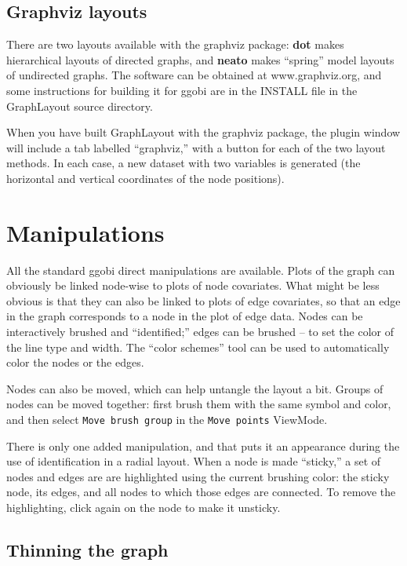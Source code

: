 \documentclass[11pt]{article}
\begin{document}
\subsection {Graphviz layouts}

There are two layouts available with the graphviz \cite{GansnerNorth00}
package:  {\bf dot} makes hierarchical layouts of directed graphs,
and {\bf neato} makes ``spring'' model layouts of undirected graphs.
The software can be obtained at www.graphviz.org, and some instructions
for building it for ggobi are in the INSTALL file in the GraphLayout
source directory.

When you have built GraphLayout with the graphviz package, the plugin
window will include a tab labelled ``graphviz,'' with a button for
each of the two layout methods.  In each case, a new dataset with two
variables is generated (the horizontal and vertical coordinates of
the node positions).

\section{Manipulations}

All the standard ggobi direct manipulations are available.  Plots of
the graph can obviously be linked node-wise to plots of node covariates.
What might be less obvious is that they can also be linked to plots of
edge covariates, so that an edge in the graph corresponds to a node in the
plot of edge data.  Nodes can be interactively brushed and ``identified;''
edges can be brushed -- to set the color of the line type and width.
The ``color schemes'' tool can be used to automatically color the nodes
or the edges.

Nodes can also be moved, which can help untangle the layout a bit.
Groups of nodes can be moved together: first brush them with
the same symbol and color, and then select {\tt Move brush group}
in the {\tt Move points} ViewMode.

There is only one added manipulation, and that puts it an appearance
during the use of identification in a radial layout.  When a node is
made ``sticky,'' a set of nodes and edges are are highlighted using
the current brushing color:  the sticky node, its edges, and all
nodes to which those edges are connected.  To remove the
highlighting, click again on the node to make it unsticky.

\subsection{Thinning the graph}
\end{document}
